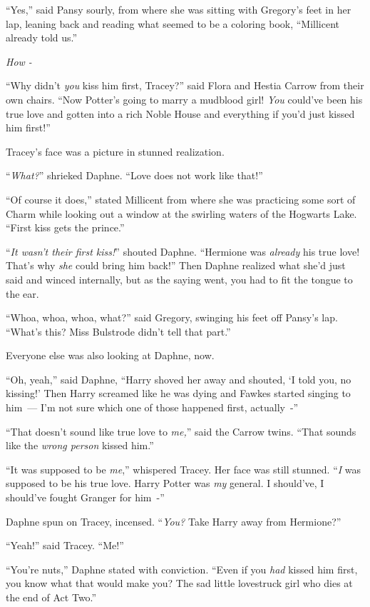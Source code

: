 ``Yes,'' said Pansy sourly, from where she was sitting with Gregory's feet in her lap, leaning back and reading what seemed to be a coloring book, ``Millicent already told us.''

\emph{How -}

``Why didn't \emph{you} kiss him first, Tracey?'' said Flora and Hestia Carrow from their own chairs. ``Now Potter's going to marry a mudblood girl! \emph{You} could've been his true love and gotten into a rich Noble House and everything if you'd just kissed him first!''

Tracey's face was a picture in stunned realization.

``\emph{What?}'' shrieked Daphne. ``Love does not work like that!''

``Of course it does,'' stated Millicent from where she was practicing some sort of Charm while looking out a window at the swirling waters of the Hogwarts Lake. ``First kiss gets the prince.''

``\emph{It wasn't their first kiss!}'' shouted Daphne. ``Hermione was \emph{already} his true love! That's why \emph{she} could bring him back!'' Then Daphne realized what she'd just said and winced internally, but as the saying went, you had to fit the tongue to the ear.

``Whoa, whoa, whoa, what?'' said Gregory, swinging his feet off Pansy's lap. ``What's this? Miss Bulstrode didn't tell that part.''

Everyone else was also looking at Daphne, now.

``Oh, yeah,'' said Daphne, ``Harry shoved her away and shouted, `I told you, no kissing!' Then Harry screamed like he was dying and Fawkes started singing to him~--- I'm not sure which one of those happened first, actually~-''

``That doesn't sound like true love to \emph{me,}'' said the Carrow twins. ``That sounds like the \emph{wrong person} kissed him.''

``It was supposed to be \emph{me},'' whispered Tracey. Her face was still stunned. ``\emph{I} was supposed to be his true love. Harry Potter was \emph{my} general. I should've, I should've fought Granger for him~-''

Daphne spun on Tracey, incensed. ``\emph{You?} Take Harry away from Hermione?''

``Yeah!'' said Tracey. ``Me!''

``You're nuts,'' Daphne stated with conviction. ``Even if you \emph{had} kissed him first, you know what that would make you? The sad little lovestruck girl who dies at the end of Act Two.''

